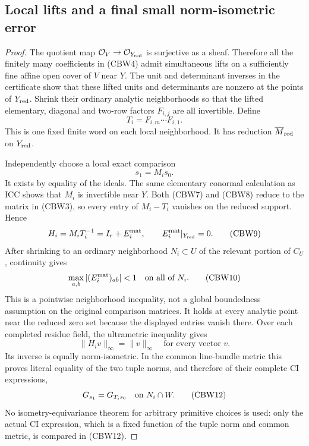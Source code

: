 \subsection{Local lifts and a final small norm-isometric error}

\begin{proof}
The quotient map $\mathcal O_V\to\mathcal O_{Y_{\rm red}}$ is
surjective as a sheaf.  Therefore all the finitely many coefficients
in (CBW4) admit simultaneous lifts on a sufficiently fine affine
open cover of $V$ near $Y$.  The unit and determinant inverses in
the certificate show that these lifted units and determinants are
nonzero at the points of $Y_{\rm red}$.  Shrink their ordinary
analytic neighborhoods so that the lifted elementary, diagonal
and two-row factors $F_{i,j}$ are all invertible.  Define
\[
                         T_i=F_{i,m}\cdots F_{i,1}.
 \tag{CBW7}
\]
This is one fixed finite word on each local neighborhood.  It has
reduction $\overline M_{\rm red}$ on $Y_{\rm red}$.

Independently choose a local exact comparison
\[
                             s_1=M_i s_0.
 \tag{CBW8}
\]
It exists by equality of the ideals.  The same elementary conormal
calculation as ICC shows that $M_i$ is invertible near $Y$.
Both (CBW7) and (CBW8) reduce to the matrix in (CBW3), so every
entry of $M_i-T_i$ vanishes on the reduced support.  Hence
\[
       H_i=M_iT_i^{-1}=I_r+E_i^{\rm mat},\qquad
                       E_i^{\rm mat}|_{Y_{\rm red}}=0.
 \tag{CBW9}
\]
After shrinking to an ordinary neighborhood $N_i\subset U$ of
the relevant portion of $C_U$, continuity gives
\[
            \max_{a,b}|(E_i^{\rm mat})_{ab}|<1
                                  \quad\hbox{on all of }N_i.
 \tag{CBW10}
\]
This is a pointwise neighborhood inequality, not a global boundedness
assumption on the original comparison matrices.  It holds at every
analytic point near the reduced zero set because the displayed
entries vanish there.  Over each completed residue field, the
ultrametric inequality gives
\[
                 \|H_i v\|_\infty=\|v\|_\infty
                                  \quad\text{for every vector }v.
 \tag{CBW11}
\]
Its inverse is equally norm-isometric.  In the common line-bundle
metric this proves literal equality of the two tuple norms, and
therefore of their complete CI expressions,
\[
                  G_{s_1}=G_{T_i s_0}
                                  \quad\hbox{on }N_i\cap W.
 \tag{CBW12}
\]
No isometry-equivariance theorem for arbitrary primitive choices is
used: only the actual CI expression, which is a fixed function of
the tuple norm and common metric, is compared in (CBW12).


\end{proof}
